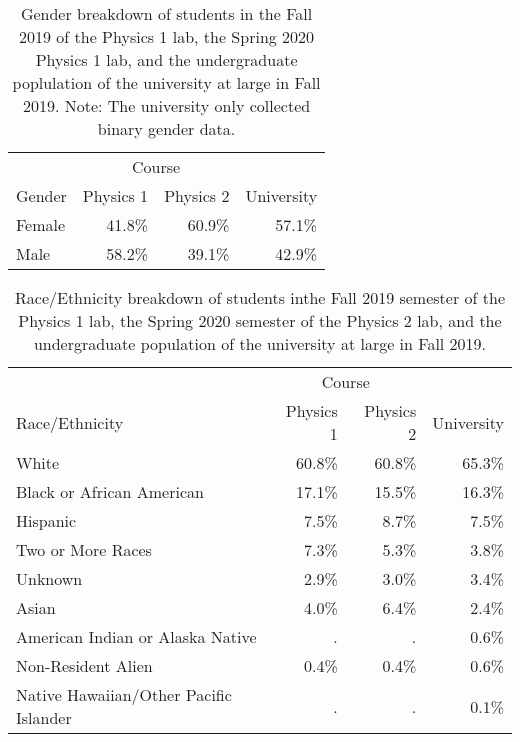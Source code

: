 \documentclass[aip, numerical, preprint]{revtex4-2}
\begin{document}
\begin{table}
  \centering
  \begin{tabular}{lrrr}
    \hline \hline
                &\multicolumn{2}{c}{Course}\\
    Gender	&Physics 1 &Physics 2 &University\\
    \hline
    Female	&41.8\%	   &60.9\%    &57.1\%\\
    Male	&58.2\%	   &39.1\%    &42.9\%\\
    \hline \hline
  \end{tabular}
  \caption{Gender breakdown of students in the Fall 2019 of the Physics 1 lab, the Spring 2020
    Physics 1 lab, and the undergraduate poplulation of the university at large in Fall 2019.
    Note: The university only collected binary gender data.}
  \label{tab:gender}
\end{table}


\begin{table}
  \centering
  \begin{tabular}{lrrr}
    \hline\hline
                                            &\multicolumn{2}{c}{Course}\\
    Race/Ethnicity                          &Physics 1  &Physics 2 &University\\
    \hline
    White                                   &60.8\%     &60.8\%    &65.3\%\\
    Black or African American               &17.1\%     &15.5\%    &16.3\%\\
    Hispanic                                &7.5\%      &8.7\%     &7.5\%\\
    Two or More Races                       &7.3\%      &5.3\%     &3.8\%\\
    Unknown                                 &2.9\%      &3.0\%     &3.4\%\\
    Asian                                   &4.0\%      &6.4\%     &2.4\%\\
    American Indian or Alaska Native        &.	        &.         &0.6\%\\
    Non-Resident Alien	                    &0.4\%      &0.4\%     &0.6\%\\
    Native Hawaiian/Other Pacific Islander  &.	        &.         &0.1\%\\
    \hline\hline
  \end{tabular}
  \caption{Race/Ethnicity breakdown of students inthe Fall 2019 semester of the Physics 1 lab,
    the Spring 2020 semester of the Physics 2 lab, and the undergraduate population of the
    university at large in Fall 2019.}
  \label{tab:race}
\end{table}
\end{document}
